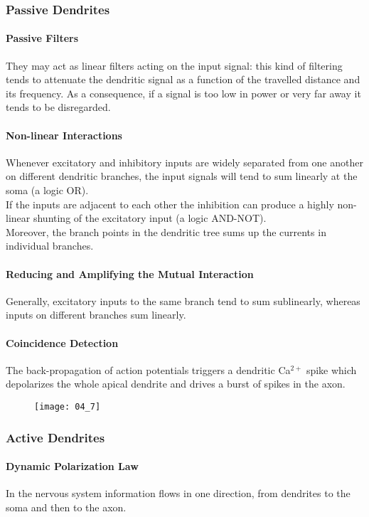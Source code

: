 \subsubsection{Passive Dendrites}
\paragraph{Passive Filters} They may act as linear filters acting on the input signal: this
kind of filtering tends to attenuate the dendritic signal as a function of the travelled
distance and its frequency. As a consequence, if a signal is too low in power or very
far away it tends to be disregarded.
\paragraph{Non-linear Interactions} Whenever excitatory and inhibitory inputs are
widely separated from one another on different dendritic branches, the input signals
will tend to sum linearly at the soma (a logic OR).\\
If the inputs are adjacent to each other the inhibition can produce a highly non-linear
shunting of the excitatory input (a logic AND-NOT).\\
Moreover, the branch points in the dendritic tree sums up the currents in individual
branches.
\paragraph{Reducing and Amplifying the Mutual Interaction} Generally, excitatory
inputs to the same branch tend to sum sublinearly, whereas inputs on different branches
sum linearly.
\paragraph{Coincidence Detection} The back-propagation of action potentials triggers
a dendritic Ca\({}^{2+}\) spike which depolarizes the whole apical dendrite and drives
a burst of spikes in the axon.
\begin{figure}[H]
    \texttt{[image: 04\_7]}
    \centering
\end{figure}
\subsubsection{Active Dendrites}
\paragraph{Dynamic Polarization Law} In the nervous system information flows in one
direction, from dendrites to the soma and then to the axon.
